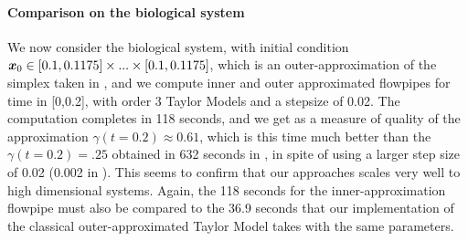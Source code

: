 





\paragraph{Comparison on the biological system}
We now consider the biological system, with initial condition $\x_0 \in [0.1,0.1175] \times...\times [0.1,0.1175]$, which is an outer-approximation
of the simplex taken in  \cite{Underapproxflowpipes}, and we compute inner and outer approximated flowpipes for time in [0,0.2], 
with order 3 Taylor Models and a stepsize of 0.02. The computation completes in 118 seconds, and we get as a measure of quality of the approximation 
$\gamma(t=0.2) \approx 0.61$, which is this time much better than the $\gamma(t=0.2) = .25$ obtained in 632 seconds in  \cite{Underapproxflowpipes}, 
in spite of using a larger step size of 0.02 (0.002 in \cite{Underapproxflowpipes}). This seems to confirm that our approaches scales very well to high dimensional systems. 
Again, the 118 seconds for the inner-approximation flowpipe must also be compared to the 36.9 seconds that our implementation of the classical 
outer-approximated Taylor Model takes with the same parameters.

